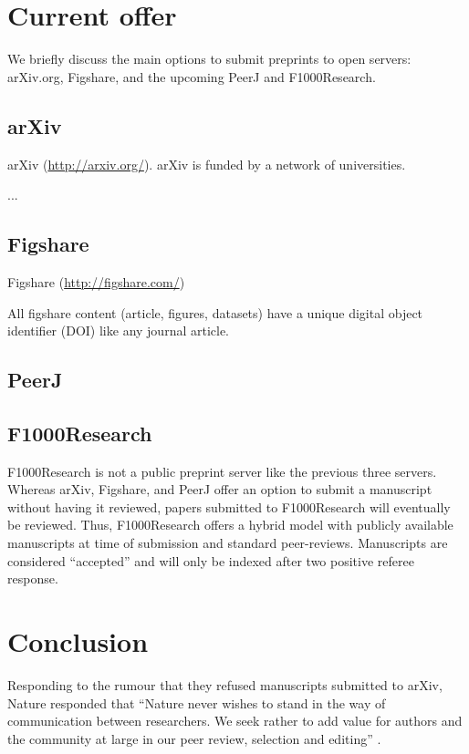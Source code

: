 \documentclass[letterpaper,twocolumn,superscriptaddress,showkeys]{revtex4}
\begin{document}
\section{Current offer}

We briefly discuss the main options to submit preprints to open servers:
arXiv.org, Figshare, and the upcoming PeerJ and F1000Research.

\subsection{arXiv}

arXiv (\href{http://arxiv.org/}{http://arxiv.org/}).
arXiv is funded by a network of universities.

...


\subsection{Figshare}


Figshare (\href{http://figshare.com/}{http://figshare.com/})

All figshare content (article, figures, datasets) have a unique digital object
identifier (DOI) like any journal article.

\subsection{PeerJ}


\subsection{F1000Research}


F1000Research is not a public preprint server like the previous three servers.
Whereas arXiv, Figshare, and PeerJ offer an option to submit a manuscript
without having it reviewed, papers submitted to F1000Research will eventually be
reviewed. Thus, F1000Research offers a hybrid model with publicly available
manuscripts at time of submission and standard peer-reviews. Manuscripts are
considered ``accepted'' and will only be indexed after two positive referee
response.

\section{Conclusion}


Responding to the rumour that they refused manuscripts submitted to arXiv,
Nature responded that ``Nature never wishes to stand in the way of communication
between researchers. We seek rather to add value for authors and the community
at large in our peer review, selection and editing'' \cite{nat05}.

\newpage


\end{document}

